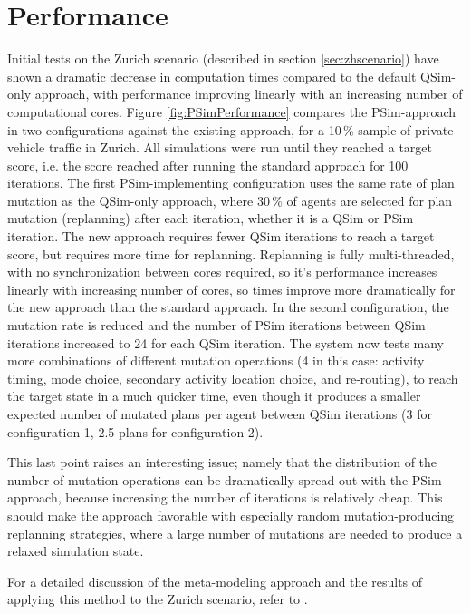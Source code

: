 \section{Performance}
Initial tests on the Zurich scenario (described in section \ref{sec:zhscenario}) have shown a dramatic decrease in computation times compared to the default QSim-only approach, with performance improving linearly with an increasing number of computational cores.
Figure \ref{fig:PSimPerformance} compares the PSim-approach in two configurations against the existing approach, for a 10\,\% sample of private vehicle traffic in Zurich. All simulations were run until they reached a target score, i.e. the score reached after running the standard approach for 100 iterations. The first PSim-implementing configuration uses the same rate of plan mutation as the QSim-only approach, where 30\,\% of agents are selected for plan mutation (replanning) after each iteration, whether it is a QSim or PSim iteration. The new approach requires fewer QSim iterations to reach a target score, but requires more time for replanning. Replanning is fully multi-threaded, with no synchronization between cores required, so it’s performance increases linearly with increasing number of cores, so times improve more dramatically for the new approach than the standard approach.
In the second configuration, the mutation rate is reduced and the number of PSim iterations between QSim iterations increased to 24 for each QSim iteration. The system now tests many more combinations of different mutation operations (4 in this case: activity timing, mode choice, secondary activity location choice, and re-routing), to reach the target state in a much quicker time, even though it produces a smaller expected number of mutated plans per agent between QSim iterations (3 for configuration 1, 2.5 plans for configuration 2).

This last point raises an interesting issue; namely that the distribution of the number of mutation operations can be dramatically spread out with the PSim approach, because increasing the number of iterations is relatively cheap. This should make the approach favorable with especially random mutation-producing replanning strategies, where a large number of mutations are needed to produce a relaxed simulation state.

For a detailed discussion of the meta-modeling approach and the results of applying this method to the Zurich scenario, refer to \citet[][]{FourieEtAl_TRR_2013}.

